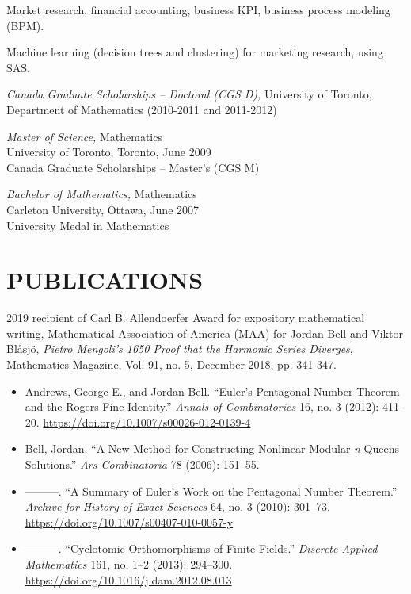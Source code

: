 \documentclass[margin, 10pt]{res} %
\begin{document}
\begin{resume}
Market research, financial accounting, business KPI, business process modeling (BPM).

Machine learning (decision trees and clustering) for marketing research, using SAS.


{\sl Canada Graduate Scholarships – Doctoral (CGS D),} University of Toronto, Department of Mathematics (2010-2011 and 2011-2012)

{\sl Master of Science,} Mathematics \\
University of Toronto, Toronto, June 2009\\
Canada Graduate Scholarships – Master's (CGS M)

{\sl Bachelor of Mathematics,} Mathematics \\
Carleton University, Ottawa, June 2007\\
University Medal in Mathematics



\section{PUBLICATIONS}

2019 recipient of Carl B. Allendoerfer Award for expository mathematical writing, Mathematical Association of America (MAA) for Jordan Bell and Viktor Blåsjö, {\em Pietro Mengoli’s 1650 Proof that the Harmonic Series Diverges}, Mathematics Magazine, Vol. 91, no. 5, December 2018, pp. 341-347.

\begin{itemize}
\item Andrews, George E., and Jordan Bell. “Euler’s Pentagonal Number Theorem and the Rogers-Fine Identity.” {\em Annals of Combinatorics} 16, no. 3 (2012): 411–20. \url{https://doi.org/10.1007/s00026-012-0139-4}

\item Bell, Jordan. “A New Method for Constructing Nonlinear Modular {\em n}-Queens Solutions.” {\em Ars Combinatoria} 78 (2006): 151–55.

\item ———. “A Summary of Euler’s Work on the Pentagonal Number Theorem.” {\em Archive for History of Exact Sciences} 64, no. 3 (2010): 301–73. \url{https://doi.org/10.1007/s00407-010-0057-y}

\item ———. “Cyclotomic Orthomorphisms of Finite Fields.” {\em Discrete Applied Mathematics} 161, no. 1–2 (2013): 294–300. \url{https://doi.org/10.1016/j.dam.2012.08.013}


\end{itemize}
\end{resume}
\end{document}
